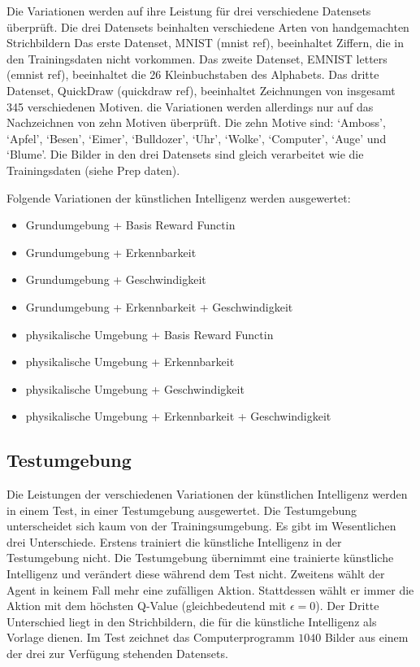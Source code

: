 Die Variationen werden auf ihre Leistung für drei verschiedene Datensets
überprüft. Die drei Datensets beinhalten verschiedene Arten von handgemachten
Strichbildern Das erste Datenset, MNIST (mnist ref),  beeinhaltet Ziffern, die
in den Trainingsdaten nicht vorkommen. Das zweite Datenset, EMNIST letters
(emnist ref), beeinhaltet die 26 Kleinbuchstaben des Alphabets. Das dritte
Datenset, QuickDraw (quickdraw ref), beeinhaltet Zeichnungen von insgesamt 345
verschiedenen Motiven. die Variationen werden allerdings nur auf das
Nachzeichnen von zehn Motiven überprüft. Die zehn Motive sind: `Amboss',
`Apfel', `Besen', `Eimer', `Bulldozer', `Uhr', `Wolke', `Computer', `Auge' und
`Blume'. Die Bilder in den drei Datensets sind gleich verarbeitet wie die
Trainingsdaten (siehe Prep daten). 

Folgende Variationen der künstlichen Intelligenz werden ausgewertet:

\begin{itemize}
  \item Grundumgebung + Basis Reward Functin
  \item Grundumgebung + Erkennbarkeit
  \item Grundumgebung + Geschwindigkeit
  \item Grundumgebung + Erkennbarkeit + Geschwindigkeit
  \item physikalische Umgebung + Basis Reward Functin
  \item physikalische Umgebung + Erkennbarkeit
  \item physikalische Umgebung + Geschwindigkeit
  \item physikalische Umgebung + Erkennbarkeit + Geschwindigkeit
\end{itemize}


\subsection{Testumgebung}
\label{sub:m_auswert_test}

Die Leistungen der verschiedenen Variationen der künstlichen Intelligenz werden
in einem Test, in einer Testumgebung ausgewertet. Die Testumgebung unterscheidet
sich kaum von der Trainingsumgebung. Es gibt im Wesentlichen drei Unterschiede.
Erstens trainiert die künstliche Intelligenz in der Testumgebung nicht. Die
Testumgebung übernimmt eine trainierte künstliche Intelligenz und verändert
diese während dem Test nicht. Zweitens wählt der Agent in keinem Fall mehr eine
zufälligen Aktion. Stattdessen wählt er immer die Aktion mit dem höchsten
Q-Value (gleichbedeutend mit $\epsilon = 0$). Der Dritte Unterschied liegt in
den Strichbildern, die für die künstliche Intelligenz als Vorlage dienen. Im
Test zeichnet das Computerprogramm $1040$ Bilder aus einem der drei zur
Verfügung stehenden Datensets. 

